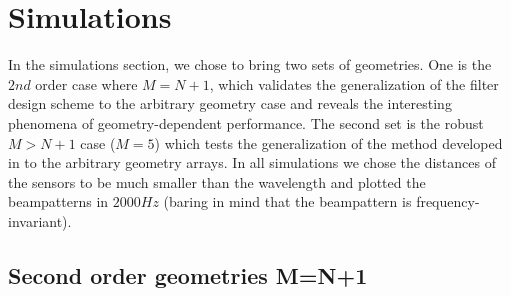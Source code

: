 \documentclass{article}
\begin{document}
\section{Simulations}
In the simulations section, we chose to bring two sets of geometries. One is the $ 2nd $ order case where $ M=N+1 $, which validates the generalization of the filter design scheme to the arbitrary geometry case and reveals the interesting phenomena of geometry-dependent performance. The second set is the robust $ M>N+1 $ case ($ M=5 $) which tests the generalization of the method developed in \cite{sps17} to the arbitrary geometry arrays. In all simulations we chose the distances of the sensors to be much smaller than the wavelength and plotted the beampatterns in $ 2000Hz $ (baring in mind that the beampattern is frequency-invariant).
\subsection{Second order geometries M=N+1}
\end{document}
